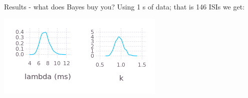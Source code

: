 \documentclass{beamer}
\begin{document}
\begin{frame}{Results - what does Bayes buy you?}
  \vskip 1cm
  Using 1 s of data; that is 146 ISIs we get:
  \vskip 1cm
  \begin{center}
    \includegraphics[width=4cm]{lambda1000.png}\qquad\includegraphics[width=4cm]{k1000.png}
  \end{center}
  \end{frame}
\end{document}
